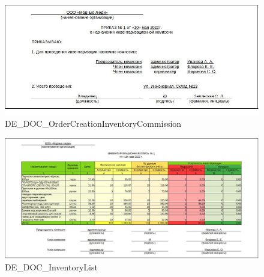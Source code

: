 \begin{figure}[!h]
    \centering

    \includegraphics[width=18cm]
    {assets/etalons/DOC_PrilazSozdInventKomis.jpg}

    \caption{DE\_DOC\_OrderCreationInventoryCommission}

    \label{fig:DOC_PrilazSozdInventKomis}
\end{figure}

\begin{figure}[!h]
    \centering

    \includegraphics[width=18cm]
    {assets/etalons/DOC_InventOpis'.jpg}

    \caption{DE\_DOC\_InventoryList}

    \label{fig:DOC_InventOpis}
\end{figure}
